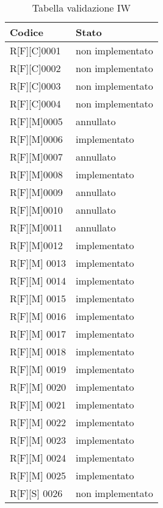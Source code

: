 \begin{center}
    \begin{longtable}{|p{3cm}|p{3cm}|}%
    \caption{Tabella validazione IW}
    \label{tab:validazione-iw}
    \endfirsthead
    \endhead
    \hline
    \textbf{Codice}  & \textbf{Stato}\\
    \hline
    R[F][C]0001    & non implementato  \\
    \hline
    R[F][C]0002   & non implementato  \\
    \hline
    R[F][C]0003    & non implementato  \\
    \hline
    R[F][C]0004    & non implementato \\
    \hline
    R[F][M]0005    & annullato  \\
    \hline
    R[F][M]0006    & implementato  \\
    \hline
    R[F][M]0007    & annullato \\
    \hline
    R[F][M]0008    & implementato  \\
    \hline
    R[F][M]0009    & annullato  \\
    \hline
    R[F][M]0010    & annullato  \\
    \hline
    R[F][M]0011    & annullato  \\
    \hline
    R[F][M]0012    &  implementato\\
    \hline
    R[F][M] 0013    &  implementato\\
    \hline
    R[F][M] 0014    &  implementato  \\
    \hline
    R[F][M] 0015    &  implementato  \\
    \hline
    R[F][M] 0016    &  implementato  \\
    \hline
    R[F][M] 0017    &  implementato  \\
    \hline
    R[F][M] 0018    &  implementato  \\
    \hline
    R[F][M] 0019    &  implementato  \\
    \hline
    R[F][M] 0020    &  implementato \\
    \hline
    R[F][M] 0021    &  implementato \\
    \hline
    R[F][M] 0022    &  implementato \\
    \hline
    R[F][M] 0023    &  implementato \\
    \hline
    R[F][M] 0024    &  implementato  \\
    \hline
    R[F][M] 0025    &  implementato  \\
    \hline
    R[F][S] 0026    &  non implementato  \\

\end{longtable}
\end{center}
